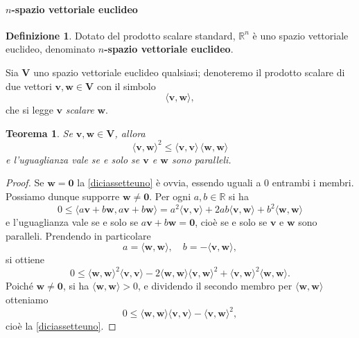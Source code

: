 \documentclass{article}
\theoremstyle{plain}
\newtheorem{thm}{Teorema}[section]
\theoremstyle{definition}
\newtheorem{defn}{Definizione}[section]
\theoremstyle{remark}
\begin{document}
\vspace{10pt}

\paragraph{$n$-spazio vettoriale euclideo}
\begin{bxthm}
\begin{defn}
Dotato del prodotto scalare standard, $\mathbb{R}^n$ è uno spazio vettoriale euclideo, denominato 
\textbf{$n$-spazio vettoriale euclideo}.
\end{defn}
\end{bxthm}

\vspace{10pt}

Sia $\mathbf{V}$ uno spazio vettoriale euclideo qualsiasi; denoteremo il prodotto scalare di due vettori $\mathbf{v}, \mathbf{w} \in \mathbf{V}$ con il simbolo 
\[\langle \mathbf{v}, \mathbf{w} \rangle, \]
che si legge $\mathbf{v}$ \textit{scalare} $\mathbf{w}$.

\vspace{10pt}

\begin{bxthm}
\begin{thm}
Se $\mathbf{v}, \mathbf{w} \in \mathbf{V}$, allora
\begin{equation}\label{diciassetteuno}
\langle \mathbf{v}, \mathbf{w} \rangle^2 \leq \langle \mathbf{v}, \mathbf{v} \rangle \, \langle \mathbf{w}, \mathbf{w} \rangle
\end{equation}
e l'uguaglianza vale se e solo se $\mathbf{v}$ e $\mathbf{w}$ sono paralleli.    
\end{thm}
\end{bxthm}
\begin{proof}
Se $\mathbf{w} = \mathbf{0}$ la \ref{diciassetteuno} è ovvia, essendo uguali a $0$ entrambi i membri. Possiamo 
dunque supporre $\mathbf{w} \neq \mathbf{0}$. Per ogni $a, b \in \mathbb{R}$ si ha
\[
0 \leq \langle a \mathbf{v} + b \mathbf{w}, a \mathbf{v} + b \mathbf{w} \rangle = a^2 \langle \mathbf{v}, \mathbf{v} \rangle + 2 a b \langle \mathbf{v}, \mathbf{w} \rangle + b^2 \langle \mathbf{w}, \mathbf{w} \rangle
\]
e l'uguaglianza vale se e solo se $a \mathbf{v} + b \mathbf{w} = \mathbf{0}$, cioè se e solo se $\mathbf{v}$ e $\mathbf{w}$ sono paralleli.
Prendendo in particolare
\[
a = \langle \mathbf{w}, \mathbf{w} \rangle, \quad b = -\langle \mathbf{v}, \mathbf{w} \rangle,
\]
si ottiene
\[
0 \leq \langle \mathbf{w}, \mathbf{w} \rangle^2 \langle \mathbf{v}, \mathbf{v} \rangle - 2 \langle \mathbf{w}, \mathbf{w} \rangle \langle \mathbf{v}, \mathbf{w} \rangle^2 + \langle \mathbf{v}, \mathbf{w} \rangle^2 \langle \mathbf{w}, \mathbf{w} \rangle.
\]
Poiché $\mathbf{w} \neq \mathbf{0}$, si ha $\langle \mathbf{w}, \mathbf{w} \rangle > 0$, e dividendo il secondo membro per $\langle \mathbf{w}, \mathbf{w} \rangle$ otteniamo
\[
0 \leq \langle \mathbf{w}, \mathbf{w} \rangle \langle \mathbf{v}, \mathbf{v} \rangle - \langle \mathbf{v}, \mathbf{w} \rangle^2,
\]
cioè la \ref{diciassetteuno}.
\end{proof}
\end{document}
